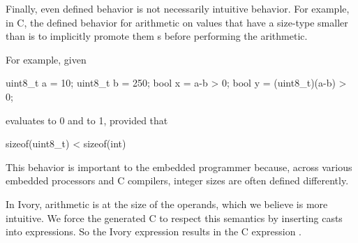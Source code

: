 Finally, even defined behavior is not necessarily intuitive behavior.  For
example, in C, the defined behavior for arithmetic on values that have a
size-type smaller than  is to implicitly promote them s before
performing the arithmetic.

For example, given
\begin{code}
uint8\_t a = 10;
uint8\_t b = 250;
bool    x = a-b > 0;
bool    y = (uint8\_t)(a-b) > 0;
\end{code}
\noindent
{} evaluates to 0 and  to 1, provided that
\begin{code}
sizeof(uint8\_t) < sizeof(int)
\end{code}
\noindent
This behavior is important to the embedded programmer because, across various
embedded processors and C compilers, integer sizes are often defined
differently.

In Ivory, arithmetic is at the size of the operands, which we believe is more
intuitive.  We force the generated C to respect this semantics by inserting
casts into expressions.  So the Ivory expression  results in the C
expression .




